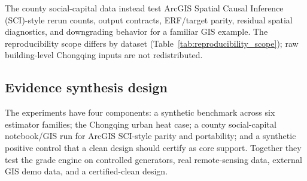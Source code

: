 \documentclass{article}
\begin{document}
The county social-capital data instead test ArcGIS Spatial Causal Inference (SCI)-style rerun counts, output contracts, ERF/target parity, residual spatial diagnostics, and downgrading behavior for a familiar GIS example. The reproducibility scope differs by dataset (Table~\ref{tab:reproducibility_scope}); raw building-level Chongqing inputs are not redistributed.

\begin{table}[htbp]
\centering
\scriptsize
\caption{Reproducibility scope of the experimental cases.}
\label{tab:reproducibility_scope}
\end{table}

\subsection{Evidence synthesis design}

The experiments have four components: a synthetic benchmark across six estimator families; the Chongqing urban heat case; a county social-capital notebook/GIS run for ArcGIS SCI-style parity and portability; and a synthetic positive control that a clean design should certify as core support. Together they test the grade engine on controlled generators, real remote-sensing data, external GIS demo data, and a certified-clean design.
\end{document}
